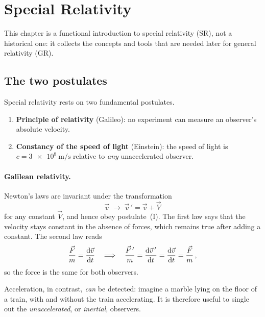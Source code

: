 \section{Special Relativity}
\label{sec:sr}


This chapter is a functional introduction to special relativity (SR), not a historical one:
it collects the concepts and tools that are needed later for general relativity (GR).

\subsection{The two postulates}
\label{sec:sr_postulates}

Special relativity rests on two fundamental postulates.
\begin{enumerate}[label=(\Roman*), leftmargin=*]
    \item \textbf{Principle of relativity} (Galileo): no experiment can measure an observer's
          absolute velocity.
    \item \textbf{Constancy of the speed of light} (Einstein): the speed of light is
          $c = \SI{3e8}{\metre\per\second}$ relative to \emph{any} unaccelerated observer.
\end{enumerate}

\paragraph{Galilean relativity.}
Newton's laws are invariant under the transformation
\begin{equation}
    \vec{v} \;\to\; \vec{v}\,' = \vec{v} + \vec{V}
    \label{eq:galilei}
\end{equation}
for any constant $\vec{V}$, and hence obey postulate~(I). The first law says that the velocity
stays constant in the absence of forces, which remains true after adding a constant. The second
law reads
\begin{equation}
    \frac{\vec{F}}{m} = \frac{\mathrm{d} \vec{v}}{\mathrm{d} t}
    \quad\Longrightarrow\quad
    \frac{\vec{F}\,'}{m} = \frac{\mathrm{d} \vec{v}\,'}{\mathrm{d} t} = \frac{\mathrm{d} \vec{v}}{\mathrm{d} t} = \frac{\vec{F}}{m} \, ,
\end{equation}
so the force is the same for both observers.

Acceleration, in contrast, \emph{can} be detected: imagine a marble lying on the floor of a train,
with and without the train accelerating. It is therefore useful to single out the
\emph{unaccelerated}, or \emph{inertial}, observers.

